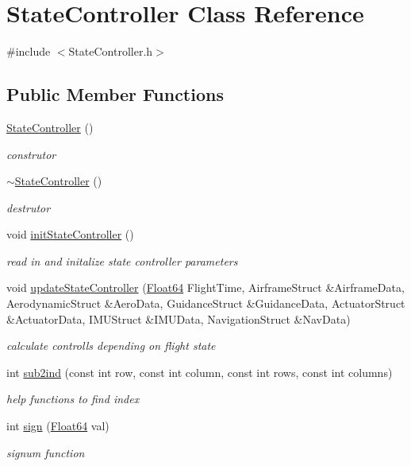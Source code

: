 \hypertarget{class_state_controller}{}\section{State\+Controller Class Reference}
\label{class_state_controller}


{\ttfamily \#include $<$State\+Controller.\+h$>$}

\subsection*{Public Member Functions}
\begin{DoxyCompactItemize}
\item 
\hyperlink{class_state_controller_a4233a366a1e79c4a9c6ffd639f404ec1}{State\+Controller} ()
\begin{DoxyCompactList}\small\item\em construtor \end{DoxyCompactList}\item 
\hyperlink{class_state_controller_af28a57ede7f1276025bebbaf400468f9}{$\sim$\+State\+Controller} ()
\begin{DoxyCompactList}\small\item\em destrutor \end{DoxyCompactList}\item 
void \hyperlink{class_state_controller_a179258c5000de44f8a9b2b7dd0e63c68}{init\+State\+Controller} ()
\begin{DoxyCompactList}\small\item\em read in and initalize state controller parameters \end{DoxyCompactList}\item 
void \hyperlink{class_state_controller_ab3af3461036ce3924c195c6d3bbb8d97}{update\+State\+Controller} (\hyperlink{group___tools_ga3f1431cb9f76da10f59246d1d743dc2c}{Float64} Flight\+Time, Airframe\+Struct \&Airframe\+Data, Aerodynamic\+Struct \&Aero\+Data, Guidance\+Struct \&Guidance\+Data, Actuator\+Struct \&Actuator\+Data, I\+M\+U\+Struct \&I\+M\+U\+Data, Navigation\+Struct \&Nav\+Data)
\begin{DoxyCompactList}\small\item\em calculate controlls depending on flight state \end{DoxyCompactList}\item 
int \hyperlink{class_state_controller_a201fc72f2f187318deca29593fd14935}{sub2ind} (const int row, const int column, const int rows, const int columns)
\begin{DoxyCompactList}\small\item\em help functions to find index \end{DoxyCompactList}\item 
int \hyperlink{class_state_controller_a0ff3b733ea48d2190daf0c49dc5401e6}{sign} (\hyperlink{group___tools_ga3f1431cb9f76da10f59246d1d743dc2c}{Float64} val)
\begin{DoxyCompactList}\small\item\em signum function \end{DoxyCompactList}\end{DoxyCompactItemize}


